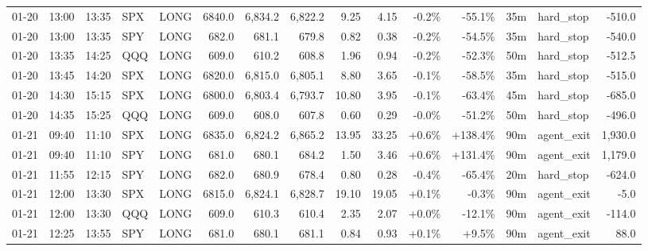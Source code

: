 \documentclass[11pt,a4paper,twoside]{article}
\begin{document}
\begin{landscape}
\begin{center}
\begin{longtable}{>{\color{txtmain}}l l l l l r r r r r r r r >{\color{txtmain}}l r}
01-20 & 13:00 & 13:35 & SPX & LONG & 6840.0 & 6,834.2 & 6,822.2 & 9.25 & 4.15 & \textcolor{lossred}{-0.2\%} & \textcolor{lossred}{-55.1\%} & 35m & hard\_stop & \textcolor{lossred}{-510.0} \\
01-20 & 13:00 & 13:35 & SPY & LONG & 682.0 & 681.1 & 679.8 & 0.82 & 0.38 & \textcolor{lossred}{-0.2\%} & \textcolor{lossred}{-54.5\%} & 35m & hard\_stop & \textcolor{lossred}{-540.0} \\
01-20 & 13:35 & 14:25 & QQQ & LONG & 609.0 & 610.2 & 608.8 & 1.96 & 0.94 & \textcolor{lossred}{-0.2\%} & \textcolor{lossred}{-52.3\%} & 50m & hard\_stop & \textcolor{lossred}{-512.5} \\
01-20 & 13:45 & 14:20 & SPX & LONG & 6820.0 & 6,815.0 & 6,805.1 & 8.80 & 3.65 & \textcolor{lossred}{-0.1\%} & \textcolor{lossred}{-58.5\%} & 35m & hard\_stop & \textcolor{lossred}{-515.0} \\
01-20 & 14:30 & 15:15 & SPX & LONG & 6800.0 & 6,803.4 & 6,793.7 & 10.80 & 3.95 & \textcolor{lossred}{-0.1\%} & \textcolor{lossred}{-63.4\%} & 45m & hard\_stop & \textcolor{lossred}{-685.0} \\
01-20 & 14:35 & 15:25 & QQQ & LONG & 609.0 & 608.0 & 607.8 & 0.60 & 0.29 & \textcolor{lossred}{-0.0\%} & \textcolor{lossred}{-51.2\%} & 50m & hard\_stop & \textcolor{lossred}{-496.0} \\
01-21 & 09:40 & 11:10 & SPX & LONG & 6835.0 & 6,824.2 & 6,865.2 & 13.95 & 33.25 & \textcolor{wingreen}{+0.6\%} & \textcolor{wingreen}{+138.4\%} & 90m & agent\_exit & \textcolor{wingreen}{1,930.0} \\
01-21 & 09:40 & 11:10 & SPY & LONG & 681.0 & 680.1 & 684.2 & 1.50 & 3.46 & \textcolor{wingreen}{+0.6\%} & \textcolor{wingreen}{+131.4\%} & 90m & agent\_exit & \textcolor{wingreen}{1,179.0} \\
01-21 & 11:55 & 12:15 & SPY & LONG & 682.0 & 680.9 & 678.4 & 0.80 & 0.28 & \textcolor{lossred}{-0.4\%} & \textcolor{lossred}{-65.4\%} & 20m & hard\_stop & \textcolor{lossred}{-624.0} \\
01-21 & 12:00 & 13:30 & SPX & LONG & 6815.0 & 6,824.1 & 6,828.7 & 19.10 & 19.05 & \textcolor{wingreen}{+0.1\%} & \textcolor{lossred}{-0.3\%} & 90m & agent\_exit & \textcolor{lossred}{-5.0} \\
01-21 & 12:00 & 13:30 & QQQ & LONG & 609.0 & 610.3 & 610.4 & 2.35 & 2.07 & \textcolor{wingreen}{+0.0\%} & \textcolor{lossred}{-12.1\%} & 90m & agent\_exit & \textcolor{lossred}{-114.0} \\
01-21 & 12:25 & 13:55 & SPY & LONG & 681.0 & 680.1 & 681.1 & 0.84 & 0.93 & \textcolor{wingreen}{+0.1\%} & \textcolor{wingreen}{+9.5\%} & 90m & agent\_exit & \textcolor{wingreen}{88.0} \\

\end{longtable}
\end{center}
\end{landscape}
\end{document}
